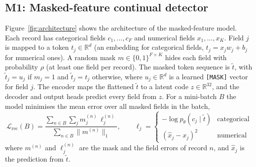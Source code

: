 \documentclass{article} %
\begin{document}
\subsection{M1: Masked-feature continual detector}

Figure~\ref{fig:architecture} shows the architecture of the masked-feature model.
Each record has categorical fields $c_1,\dots,c_F$ and numerical fields
$x_1,\dots,x_K$. Field $j$ is mapped to a token $t_j\in\mathbb{R}^d$ (an
embedding for categorical fields, $t_j = x_j w_j + b_j$ for numerical ones).
A random mask $m\in\{0,1\}^{F+K}$ hides each field with probability $\rho$
(at least one field per record). The masked token sequence is $\tilde t$, with
$\tilde t_j = u_j$ if $m_j = 1$ and $\tilde t_j = t_j$ otherwise, where
$u_j\in\mathbb{R}^d$ is a learned \texttt{[MASK]} vector for field $j$. The
encoder maps the flattened $\tilde t$ to a latent code $z\in\mathbb{R}^{32}$, and
the decoder and output heads predict every field from $z$. For a mini-batch $B$
the model minimises the mean error over all masked fields in the batch,
\begin{equation}
\mathcal{L}_{\text{rec}}(B) = \frac{\sum_{n\in B}\sum_{j} m^{(n)}_j\,\ell^{(n)}_j}{\sum_{n\in B}\lVert m^{(n)}\rVert_1},\qquad
\ell_j = \begin{cases}-\log p_\theta(c_j \mid \tilde t) & \text{categorical}\\
(\hat x_j - x_j)^2 & \text{numerical}\end{cases}
\label{eq:mfr}
\end{equation}
where $m^{(n)}$ and $\ell^{(n)}_j$ are the mask and the field errors of record $n$,
and $\hat x_j$ is the prediction from $\tilde t$.
\end{document}
